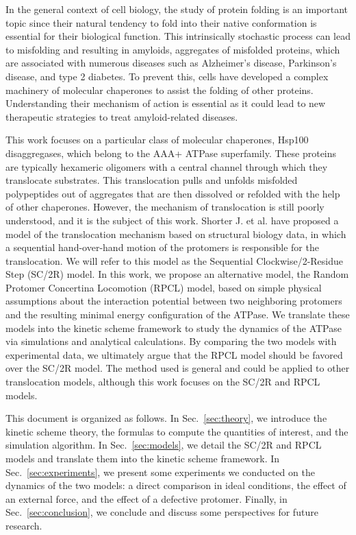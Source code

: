 In the general context of cell biology, the study of protein folding is an important topic since their natural tendency to fold into their native conformation is essential for their biological function. This intrinsically stochastic process can lead to misfolding and resulting in amyloids, aggregates of misfolded proteins, which are associated with numerous diseases such as Alzheimer's disease, Parkinson's disease, and type 2 diabetes\cite{chiti_protein_2017}. To prevent this, cells have developed a complex machinery of molecular chaperones to assist the folding of other proteins. Understanding their mechanism of action is essential as it could lead to new therapeutic strategies to treat amyloid-related diseases.

This work focuses on a particular class of molecular chaperones, Hsp100 disaggregases, which belong to the AAA+ ATPase superfamily\cite{tucker_aaa+_2007}. These proteins are typically hexameric oligomers with a central channel through which they translocate substrates\cite{mayer_gymnastics_2010}. This translocation pulls and unfolds misfolded polypeptides out of aggregates that are then dissolved or refolded with the help of other chaperones. However, the mechanism of translocation is still poorly understood, and it is the subject of this work. Shorter J. et al. have proposed a model of the translocation mechanism based on structural biology data, in which a sequential hand-over-hand motion of the protomers is responsible for the translocation\cite{shorter_spiraling_2019}. We will refer to this model as the Sequential Clockwise/2-Residue Step (SC/2R) model. In this work, we propose an alternative model, the Random Protomer Concertina Locomotion (RPCL) model, based on simple physical assumptions about the interaction potential between two neighboring protomers and the resulting minimal energy configuration of the ATPase. We translate these models into the kinetic scheme framework to study the dynamics of the ATPase via simulations and analytical calculations. By comparing the two models with experimental data, we ultimately argue that the RPCL model should be favored over the SC/2R model. The method used is general and could be applied to other translocation models, although this work focuses on the SC/2R and RPCL models.

This document is organized as follows. In Sec.~\ref{sec:theory}, we introduce the kinetic scheme theory, the formulas to compute the quantities of interest, and the simulation algorithm. In Sec.~\ref{sec:models}, we detail the SC/2R and RPCL models and translate them into the kinetic scheme framework. In Sec.~\ref{sec:experiments}, we present some experiments we conducted on the dynamics of the two models: a direct comparison in ideal conditions, the effect of an external force, and the effect of a defective protomer. Finally, in Sec.~\ref{sec:conclusion}, we conclude and discuss some perspectives for future research.

